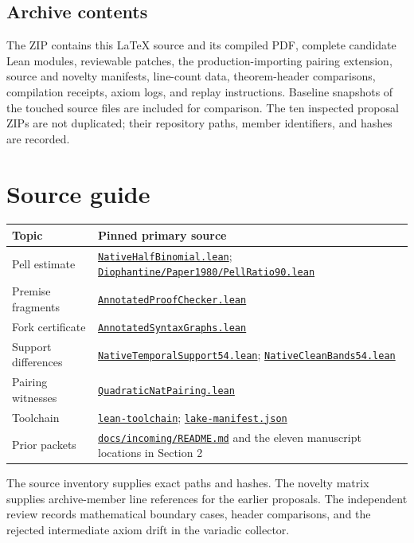 \documentclass[11pt]{article}
\theoremstyle{remark}\newtheorem{remark}[proposition]{Remark}
\newcommand{\code}[1]{\nolinkurl{#1}}
\newcommand{\sref}[2]{\href{https://github.com/VladimirReshetnikov/ProveIt/blob/7fa06d530df54d4aeb2e18027409df082234c69e/#1}{#2}}
\newcommand{\source}[1]{\sref{Computability/DiophantineConsistency/Lean/DiophantineConsistency/#1.lean}{\code{#1.lean}}}
\begin{document}
\subsection{Archive contents}

The ZIP contains this LaTeX source and its compiled PDF, complete candidate Lean modules, reviewable patches, the production-importing pairing extension, source and novelty manifests, line-count data, theorem-header comparisons, compilation receipts, axiom logs, and replay instructions. Baseline snapshots of the touched source files are included for comparison. The ten inspected proposal ZIPs are not duplicated; their repository paths, member identifiers, and hashes are recorded.

\section{Source guide}

\begin{longtable}{P{.24\textwidth}P{.67\textwidth}}
\toprule
Topic & Pinned primary source\\\midrule\endhead
Pell estimate & \source{NativeHalfBinomial}; \sref{Computability/HilbertTenthProblem/Lean/Diophantine/Paper1980/PellRatio90.lean}{\code{Diophantine/Paper1980/PellRatio90.lean}}\\
Premise fragments & \source{AnnotatedProofChecker}\\
Fork certificate & \source{AnnotatedSyntaxGraphs}\\
Support differences & \source{NativeTemporalSupport54}; \source{NativeCleanBands54}\\
Pairing witnesses & \source{QuadraticNatPairing}\\
Toolchain & \sref{lean-toolchain}{\code{lean-toolchain}}; \sref{lake-manifest.json}{\code{lake-manifest.json}}\\
Prior packets & \sref{docs/incoming/README.md}{\code{docs/incoming/README.md}} and the eleven manuscript locations in Section 2\\
\bottomrule
\end{longtable}

The source inventory supplies exact paths and hashes. The novelty matrix supplies archive-member line references for the earlier proposals. The independent review records mathematical boundary cases, header comparisons, and the rejected intermediate axiom drift in the variadic collector.
\end{document}
